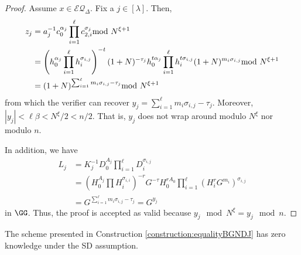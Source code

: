 \begin{proof}
Assume $x\in\mathcal{EQ}_\Delta$. Fix a $j\in [\lambda]$. Then, \begin{align*}
    z_{j}&=a_{j}^{-1}c_0^{\alpha_j}\prod_{i=1}^\ell c_{2,i}^{\sigma_{j}} \smod N^{\xi+1}\\ 
    &=\left(h_0^{\alpha_j}\prod_{i=1}^{\ell} h_i^{\sigma_{i,j}}\right)^{-t}(1+N)^{-\tau_{j}}h_0^{t\alpha_j}\prod_{i=1}^\ell h_i^{t\sigma_{i,j}} (1+N)^{m_i\sigma_{i,j}} \smod N^{\xi+1}\\ 
    &=(1+N)^{\sum_{i=1}^\ell m_i\sigma_{i,j}-\tau_{j}}\smod N^{\xi+1}
\end{align*} 
from which the verifier can recover $y_{j}=\sum_{i=1}^\ell m_i\sigma_{i,j}-\tau_{j}$.
 Moreover, $|y_j|<\ell \beta <N^\xi/2<n/2$. That is, $y_j$ does not wrap around modulo $N^\xi$ nor modulo $n$. 

In addition, we have \begin{align*}
    L_j &= K_j^{-1} D_0^{A_j}\prod_{i=1}^\ell D_i^{\sigma_{i,j}} \\ 
    &= \left  (H_0^{A_j}\prod H_i^{\sigma_{i,i}}\right)^{-r} G^{-\tau} H_0^{rA_0}\prod_{i=1}^\ell (H_i^rG^{m_i})^{\sigma_{i,j}}\\
    &= G^{\sum_{i=1}^\ell m_i\sigma_{i,j} -\tau_{j}} =G^{y_j}
\end{align*} in $\GG$.
Thus, the proof is accepted as valid because $y_j\mod N^\xi=y_j\mod n$.

\end{proof}


\begin{lemma}
The scheme presented in Construction \ref{construction:equalityBGNDJ} has zero knowledge under the SD assumption.
\end{lemma}



